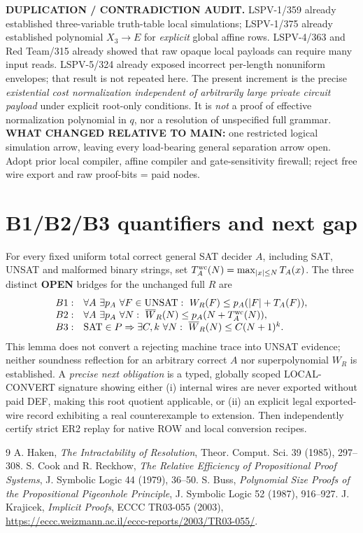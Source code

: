 \documentclass[11pt]{article}
\begin{document}
\noindent\textbf{DUPLICATION / CONTRADICTION AUDIT.} LSPV-1/359 already established three-variable truth-table local simulations; LSPV-1/375 already established polynomial $X_3\to E$ for \emph{explicit} global affine rows. LSPV-4/363 and Red Team/315 already showed that raw opaque local payloads can require many input reads. LSPV-5/324 already exposed incorrect per-length nonuniform envelopes; that result is not repeated here. The present increment is the precise \emph{existential cost normalization independent of arbitrarily large private circuit payload} under explicit root-only conditions. It is \emph{not} a proof of effective normalization polynomial in $q$, nor a resolution of unspecified full grammar. \textbf{WHAT CHANGED RELATIVE TO MAIN:} one restricted logical simulation arrow, leaving every load-bearing general separation arrow open. Adopt prior local compiler, affine compiler and gate-sensitivity firewall; reject free wire export and raw proof-bits = paid nodes.

\section*{B1/B2/B3 quantifiers and next gap}
For every fixed uniform total correct general SAT decider $A$, including SAT, UNSAT and malformed binary strings, set $T_A^{\rm wc}(N)=\max_{|x|\le N}T_A(x)$. The three distinct \textbf{OPEN} bridges for the unchanged full $R$ are
\[
\begin{array}{ll}
B1: & \forall A\ \exists p_A\ \forall F\in\mathrm{UNSAT}:\
 W_R(F)\le p_A(|F|+T_A(F)),\\
B2: & \forall A\ \exists p_A\ \forall N:\
 \overline W_R(N)\le p_A(N+T_A^{\rm wc}(N)),\\
B3: & \mathrm{SAT}\in P\Rightarrow\exists C,k\ \forall N:\
 \overline W_R(N)\le C(N+1)^k.
\end{array}
\]
This lemma does not convert a rejecting machine trace into UNSAT evidence; neither soundness reflection for an arbitrary correct $A$ nor superpolynomial $W_R$ is established. A \emph{precise next obligation} is a typed, globally scoped LOCAL-CONVERT signature showing either (i) internal wires are never exported without paid DEF, making this root quotient applicable, or (ii) an explicit legal exported-wire record exhibiting a real counterexample to extension. Then independently certify strict ER2 replay for native ROW and local conversion recipes.

\begin{thebibliography}{9}
\bibitem{Haken} A. Haken, \emph{The Intractability of Resolution}, Theor. Comput. Sci. 39 (1985), 297--308.
 S. Cook and R. Reckhow, \emph{The Relative Efficiency of Propositional Proof Systems}, J. Symbolic Logic 44 (1979), 36--50.
\bibitem{Buss} S. Buss, \emph{Polynomial Size Proofs of the Propositional Pigeonhole Principle}, J. Symbolic Logic 52 (1987), 916--927.
\bibitem{Krajicek} J. Krajicek, \emph{Implicit Proofs}, ECCC TR03-055 (2003), \url{https://eccc.weizmann.ac.il/eccc-reports/2003/TR03-055/}.
\end{thebibliography}
\end{document}

